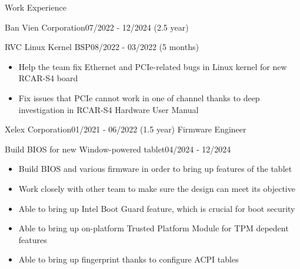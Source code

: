 \documentclass{resume} %
\begin{document}
\begin{rSection}{Work Experience}
\begin{rCompanySubsection}{Ban Vien Corporation}{07/2022 - 12/2024 (2.5 year)}
        \begin{rProjectSubsubsectionV2}{RVC Linux Kernel BSP}{08/2022 - 03/2022 (5 months)} {
        }{
            \begin{itemize}
                \item Help the team fix Ethernet and PCIe-related bugs in Linux kernel for new RCAR-S4 board
            \end{itemize}
        }{
            \begin{itemize}
                \item Fix issues that PCIe cannot work in one of channel thanks to deep investigation in RCAR-S4 Hardware User Manual
            \end{itemize}
        }
        \end{rProjectSubsubsectionV2}
    \end{rCompanySubsection}
    \begin{rCompanySubsection}{Xelex Corporation}{01/2021 - 06/2022 (1.5 year)}
        {Firmware Engineer}
        {}
        \begin{rProjectSubsubsectionV2}{Build BIOS for new Window-powered tablet}{04/2024 - 12/2024}{
            \begin{itemize}
                \item Build BIOS and various firmware in order to bring up features of the tablet
                \item Work closely with other team to make sure the design can meet its objective
            \end{itemize}
        }{
            \begin{itemize}
                \item Able to bring up Intel Boot Guard feature, which is crucial for boot security
                \item Able to bring up on-platform Trusted Platform Module for TPM depedent features
                \item Able to bring up fingerprint thanks to configure ACPI tables
            \end{itemize}
        }
        \end{rProjectSubsubsectionV2}
    \end{rCompanySubsection}


\end{rSection}
\end{document}
